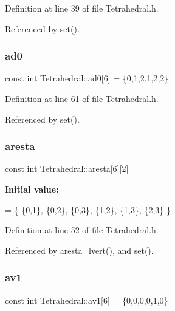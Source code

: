 Definition at line 39 of file Tetrahedral.\+h.



Referenced by set().

\mbox{\label{classTetrahedral_ae9f066e7b669b78adf0736e3a6271564}} 
\subsubsection{\texorpdfstring{ad0}{ad0}}
{\footnotesize\ttfamily const int Tetrahedral\+::ad0\mbox{[}6\mbox{]} = \{0,1,2,1,2,2\}\hspace{0.3cm}{\ttfamily [private]}}



Definition at line 61 of file Tetrahedral.\+h.



Referenced by set().

\mbox{\label{classTetrahedral_a8b15407c8a0a1e67fb9dd5db6d8b8cff}} 
\subsubsection{\texorpdfstring{aresta}{aresta}}
{\footnotesize\ttfamily const int Tetrahedral\+::aresta\mbox{[}6\mbox{]}\mbox{[}2\mbox{]}\hspace{0.3cm}{\ttfamily [private]}}

{\bfseries Initial value\+:}
\begin{DoxyCode}
=
  \{ \{0,1\}, 
    \{0,2\}, 
    \{0,3\}, 
    \{1,2\}, 
    \{1,3\}, 
    \{2,3\}  
  \}
\end{DoxyCode}


Definition at line 52 of file Tetrahedral.\+h.



Referenced by aresta\+\_\+lvert(), and set().

\mbox{\label{classTetrahedral_a3e50a0017016ecd4213313f3ac9ce8c0}} 
\subsubsection{\texorpdfstring{av1}{av1}}
{\footnotesize\ttfamily const int Tetrahedral\+::av1\mbox{[}6\mbox{]} = \{0,0,0,0,1,0\}\hspace{0.3cm}{\ttfamily [private]}}



